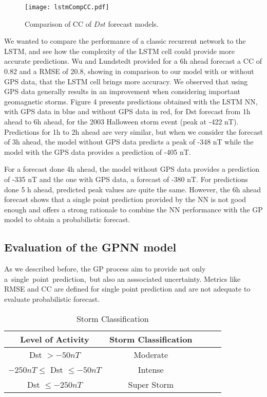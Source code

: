 \begin{figure}
	\texttt{[image: lstmCompCC.pdf]}
	\caption{Comparison of CC of $Dst$ forecast models.}
	\label{fig:lstmCC}
\end{figure}


We wanted to compare the performance of a classic recurrent network to the LSTM, and see 
how the complexity of the LSTM cell could provide more accurate predictions. Wu and Lundstedt \citet{wu1997geomagnetic} 
provided for a 6h ahead forecast a CC of 0.82 and a RMSE of 20.8, showing in comparison to our model with or 
without GPS data, that the LSTM cell brings more accuracy. We observed that using GPS data generally results 
in an improvement when considering important geomagnetic storms. Figure 4 presents predictions obtained with 
the LSTM NN, with GPS data in blue and without GPS data in red, for Dst forecast from 1h ahead to 6h ahead, 
for the 2003 Halloween storm event (peak at -422 nT). Predictions for 1h to 2h ahead are very similar, but when 
we consider the forecast of 3h ahead, the model without GPS data predicts a peak of -348 nT while the model 
with the GPS data provides a prediction of -405 nT. 

For a forecast done 4h ahead, the model without GPS data 
provides a prediction of -335 nT and the one with GPS data, a forecast of -380 nT. For predictions done 5 h ahead, 
predicted peak values are quite the same. However, the 6h ahead forecast shows that a single point prediction 
provided by the NN is not good enough and offers a strong rationale to combine the NN performance with the 
GP model to obtain a probabilistic forecast. 


\subsection{Evaluation of the GPNN model}

As we described before, the GP process aim to provide not only a\ single\ point\ prediction,\ 
but also an asssociated  uncertainty. Metrics like RMSE and CC are defined for single point prediction 
and  are not adequate  to evaluate  probabilistic forecast.

\begin{table}[h]
	\centering
	\caption{Storm Classification}
	\label{table:stormclass}
	\begin{tabular}{ccccc}
	\hline
	Level of Activity & Storm Classification \\ \hline
	Dst $> -50 nT$ & Moderate\\
	$-250 nT \leq $ Dst $\leq -50 nT$ & Intense\\
	Dst $\leq -250 nT$ & Super Storm\\ \hline
	\end{tabular}
\end{table}

